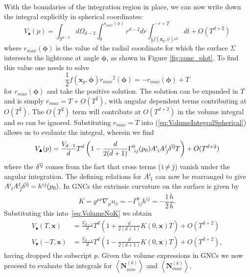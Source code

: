 \documentclass[12pt]{article}
\newcommand{\be}{\begin{equation}}
\newcommand{\ee}{\end{equation}}
\newcommand{\ibar}{{\overline{\emph\i}}}
\newcommand{\jbar}{{\overline{\emph\j}}}
\begin{document}
With the boundaries of the integration region in place, we can now write down the integral explicitly in spherical coordinates:
\be\label{eq:VolumeIntegralSpherical}
V_\blacktriangle (p)=\int_{S^{d-2}}
d\Omega_{d-2}
\int_{0}^{r_{max} (\phi)}r^{d-2}dr
\int_{\frac{1}{2}f (\mathbf{x}_p,\phi)r^2}^{-r+T}
d\overline{t}+O (T^{d+2})
\ee
where $r_{max} (\boldsymbol\phi)$ is the value of the radial coordinate for which the surface $\Sigma$ intersects the lightcone at angle $\boldsymbol\phi$, as shown in Figure \ref{fig:cone_plot}. To find this value one needs to solve 
\be
\frac{1}{2}f (\mathbf{x}_p,\boldsymbol\phi){r_{max}}^2 (\boldsymbol\phi)=-r_{max} (\boldsymbol\phi)+T
\ee 
for $r_{max} (\boldsymbol\phi)$ and take the positive solution. The solution can be expanded in $T$ and is simply $r_{max}=T+O (T^2)$, with angular dependent terms contributing at $O (T^2)$. The $O (T^2)$ term will contribute at $O (T^{d+2})$ in the volume integral and so can be ignored. Substituting $r_{max}=T$ into (\ref{eq:VolumeIntegralSpherical}) allows us to evaluate the integral, wherein we find 
\be\label{eq:VolumeNoK}
V_\blacktriangle (p)
=\frac{V_{d-1}}{d}T^d\left (1-\frac{d}{2 (d+1)}\Gamma^{0}_{\;ij} (p_0)A^{i}_{\;\ibar}A^{j}_{\;\jbar}\delta^{\ibar\jbar}T\right)
+O (T^{d+2})
\ee
where the $\delta^{\ibar\jbar}$ comes from the fact that cross terms ($\ibar\neq \jbar$) vanish under the angular integration. The defining relations for $A^{i}_{\;\ibar}$ can now be rearranged to give $A^{i}_{\;\ibar}A^{j}_{\;\jbar}\delta^{\ibar\jbar}=h^{ij} (p_0)$. In GNCs the extrinsic curvature on the surface is given by
\be\label{eq:K}
K
=g^{\mu\nu }\nabla_{\mu}n_{\nu}
=-\Gamma^{0}_{\;ij}h^{ij}=-\frac{1}{2}\frac{\dot{h}}{h}.
\ee
Substituting this into~\eqref{eq:VolumeNoK} we obtain 
\begin{align}
V_\blacktriangle (T,\mathbf x)
&=\frac{V_{d-1}}{d}T^d\left (1+\frac{d}{2 (d+1)}K (0,\mathbf{x})T\right)
+O (T^{d+2}) \label{eq:TopVolumeWithK}\\
V_\blacktriangledown (-T,\mathbf x)
&=\frac{V_{d-1}}{d}T^d\left (1-\frac{d}{2 (d+1)}K (0,\mathbf{x})T\right)
+O (T^{d+2}), \label{eq:BottomVolumeWithK}
\end{align}
having dropped the subscript $p$. Given the volume expressions in GNCs we now proceed to evaluate the integrals for $\left\langle \textbf{N}_{min}^{ (k)}\right\rangle$ and $\left\langle \textbf{N}_{max}^{ (k)}\right\rangle$.
\end{document}
